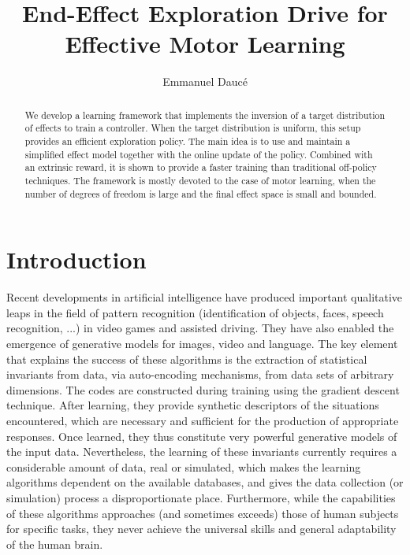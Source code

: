 \documentclass[runningheads]{llncs}
\begin{document}
%
\title{End-Effect Exploration Drive for Effective Motor Learning}
%
%
\author{Emmanuel Daucé}
%
%
%
\maketitle              %
%
\begin{abstract}
We develop a learning framework that implements the inversion of a target distribution
of effects to train a controller. When the target distribution is uniform, this
setup provides an efficient exploration policy. The main idea is to use and maintain a simplified effect model together with the online update of the policy.
Combined with an extrinsic reward, it is shown to provide a faster 
training than traditional off-policy techniques. 
The framework is mostly devoted to the case of motor learning, when
the number of degrees of freedom is large and the final effect space
is small and bounded.   
\end{abstract}
%
%
%
\section{Introduction}

Recent developments in artificial intelligence have produced important qualitative leaps in the field of pattern recognition (identification of objects, faces, speech recognition, ...) in video games and assisted driving. 
They have also enabled the emergence of generative models for images, video and language. The key element that explains the success of these algorithms is the extraction of statistical invariants from data, via auto-encoding mechanisms, from data sets of arbitrary dimensions. The codes are constructed during training using the gradient descent technique. After learning, they provide synthetic descriptors of the situations encountered, which are necessary and sufficient for the production of appropriate responses.  Once learned, they thus constitute very powerful generative models of the input data. Nevertheless, the learning of these invariants currently requires a considerable amount of data, real or simulated, which makes the learning algorithms dependent on the available databases, and gives the data collection (or simulation) process a disproportionate place. Furthermore, while the capabilities of these algorithms approaches (and sometimes exceeds) those of human subjects for specific tasks, they never achieve the universal skills and general adaptability of the human brain. 
\end{document}
